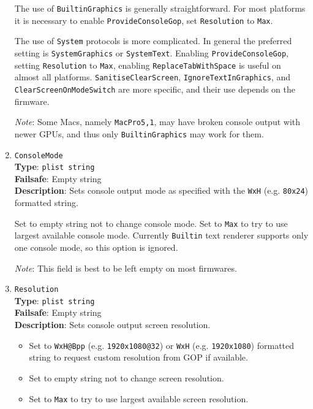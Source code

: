\documentclass[]{article}
\providecommand{\tightlist}{%
  \setlength{\itemsep}{0pt}\setlength{\parskip}{0pt}}
\begin{document}
\begin{enumerate}
  The use of \texttt{BuiltinGraphics} is generally straightforward.
  For most platforms it is necessary to enable \texttt{ProvideConsoleGop},
  set \texttt{Resolution} to \texttt{Max}.

  The use of \texttt{System} protocols is more complicated. In general
  the preferred setting is \texttt{SystemGraphics} or \texttt{SystemText}.
  Enabling \texttt{ProvideConsoleGop}, setting \texttt{Resolution} to
  \texttt{Max}, enabling \texttt{ReplaceTabWithSpace} is useful on almost
  all platforms. \texttt{SanitiseClearScreen}, \texttt{IgnoreTextInGraphics},
  and \texttt{ClearScreenOnModeSwitch} are more specific, and their use
  depends on the firmware.

  \emph{Note}: Some Macs, namely \texttt{MacPro5,1}, may have broken
  console output with newer GPUs, and thus only \texttt{BuiltinGraphics}
  may work for them.

\item
  \texttt{ConsoleMode}\\
  \textbf{Type}: \texttt{plist\ string}\\
  \textbf{Failsafe}: Empty string\\
  \textbf{Description}: Sets console output mode as specified
  with the \texttt{WxH} (e.g. \texttt{80x24}) formatted string.

  Set to empty string not to change console mode. Set to \texttt{Max}
  to try to use largest available console mode. Currently
  \texttt{Builtin} text renderer supports only one console mode, so
  this option is ignored.

  \emph{Note}: This field is best to be left empty on most firmwares.

\item
  \texttt{Resolution}\\
  \textbf{Type}: \texttt{plist\ string}\\
  \textbf{Failsafe}: Empty string\\
  \textbf{Description}: Sets console output screen resolution.

  \begin{itemize}
  \tightlist
  \item Set to \texttt{WxH@Bpp} (e.g. \texttt{1920x1080@32}) or \texttt{WxH}
  (e.g. \texttt{1920x1080}) formatted string to request custom resolution
  from GOP if available.
  \item Set to empty string not to change screen resolution.
  \item Set to \texttt{Max} to try to use largest available screen resolution.
  \end{itemize}


\end{enumerate}
\end{document}
